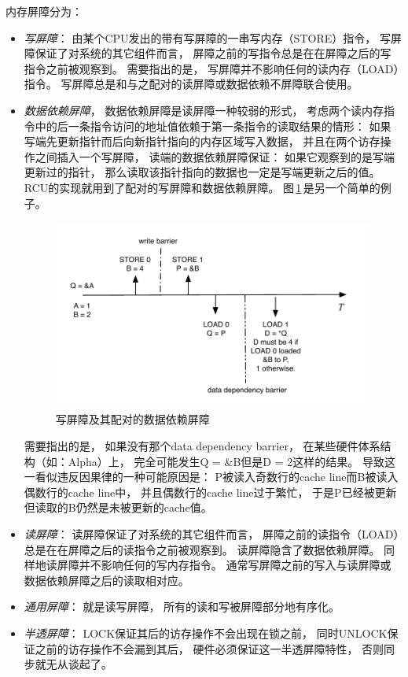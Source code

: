 内存屏障分为：
\begin{itemize}
  \item {\em 写屏障}：
    由某个CPU发出的带有写屏障的一串写内存（STORE）指令，
    写屏障保证了对系统的其它组件而言，
    屏障之前的写指令总是在在屏障之后的写指令之前被观察到。
    需要指出的是，
    写屏障并不影响任何的读内存（LOAD）指令。
    写屏障总是和与之配对的读屏障或数据依赖不屏障联合使用。
  \item {\em 数据依赖屏障}，
    数据依赖屏障是读屏障一种较弱的形式，
    考虑两个读内存指令中的后一条指令访问的地址值依赖于第一条指令的读取结果的情形：
    如果写端先更新指针而后向新指针指向的内存区域写入数据，
    并且在两个访存操作之间插入一个写屏障，
    读端的数据依赖屏障保证：
    如果它观察到的是写端更新过的指针，
    那么读取该指针指向的数据也一定是写端更新之后的值。
    RCU的实现就用到了配对的写屏障和数据依赖屏障。
    图\,\ref{fig:ddmb}\,是另一个简单的例子。
    \begin{figure}[!ht]
      \centering
      \includegraphics[scale=0.75]{fig/wmb_ddmb}
      \caption{写屏障及其配对的数据依赖屏障}
      \label{fig:ddmb}
    \end{figure}
    需要指出的是，
    如果没有那个data dependency barrier，
    在某些硬件体系结构（如：Alpha）上，
    完全可能发生Q = \&B但是D = 2这样的结果。
    导致这一看似违反因果律的一种可能原因是：
    P被读入奇数行的cache line而B被读入偶数行的cache line中，
    并且偶数行的cache line过于繁忙，
    于是P已经被更新但读取的B仍然是未被更新的cache值。
  \item {\em 读屏障}：
    读屏障保证了对系统的其它组件而言，
    屏障之前的读指令（LOAD）总是在在屏障之后的读指令之前被观察到。
    读屏障隐含了数据依赖屏障。
    同样地读屏障并不影响任何的写内存指令。
    通常写屏障之前的写入与读屏障或数据依赖屏障之后的读取相对应。
  \item {\em 通用屏障}：
    就是读写屏障，
    所有的读和写被屏障部分地有序化。
  \item {\em 半透屏障}：
    LOCK保证其后的访存操作不会出现在锁之前，
    同时UNLOCK保证之前的访存操作不会漏到其后，
    硬件必须保证这一半透屏障特性，
    否则同步就无从谈起了。
\end{itemize}

